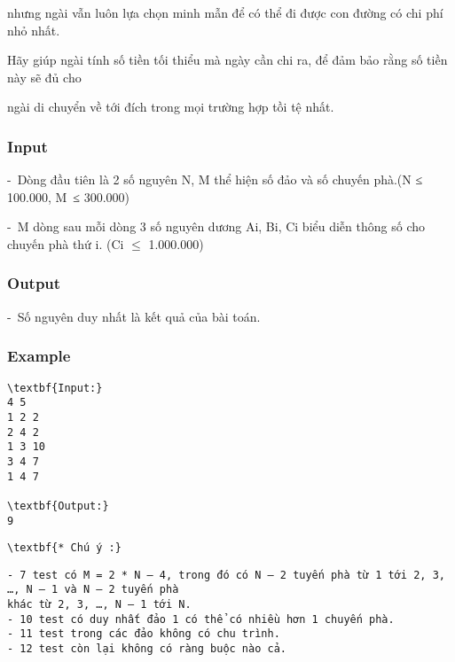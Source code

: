    nhưng ngài vẫn luôn lựa chọn minh mẫn để có thể đi được con đường có chi phí nhỏ nhất.  

   Hãy giúp ngài tính số tiền tối thiểu mà ngày cần chi ra, để đảm bảo rằng số tiền này sẽ đủ cho  

   ngài di chuyển về tới đích trong mọi trường hợp tồi tệ nhất.  



\subsubsection{   Input  }

   - Dòng đầu tiên là 2 số nguyên N, M thể hiện số đảo và số chuyến phà.(N ≤ 100.000, M ≤ 300.000)  

   - M dòng sau mỗi dòng 3 số nguyên dương Ai, Bi, Ci biểu diễn thông số cho chuyến phà thứ i. (Ci  $\le$  1.000.000)  

\subsubsection{   Output  }

   - Số nguyên duy nhất là kết quả của bài toán.  

\subsubsection{   Example  }
\begin{verbatim}
\textbf{Input:}
4 5
1 2 2
2 4 2
1 3 10
3 4 7
1 4 7

\textbf{Output:}
9
\end{verbatim}
\begin{verbatim}
\textbf{* Chú ý :}\end{verbatim}
\begin{verbatim}
- 7 test có M = 2 * N – 4, trong đó có N – 2 tuyến phà từ 1 tới 2, 3, …, N – 1 và N – 2 tuyến phà
khác từ 2, 3, …, N – 1 tới N.
- 10 test có duy nhất đảo 1 có thể có nhiều hơn 1 chuyến phà.
- 11 test trong các đảo không có chu trình.
- 12 test còn lại không có ràng buộc nào cả. \end{verbatim}

